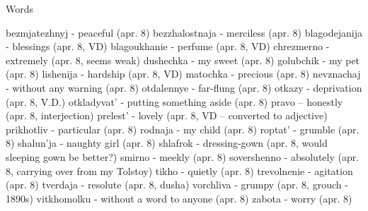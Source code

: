 Words

bezmjatezhnyj - peaceful (apr. 8)
bezzhalostnaja - merciless (apr. 8)
blagodejanija - blessings (apr. 8, VD)
blagoukhanie - perfume (apr. 8, VD)
chrezmerno - extremely (apr. 8, seems weak)
dushechka - my sweet (apr. 8)
golubchik - my pet (apr. 8)
lishenija - hardship (apr. 8, VD)
matochka - precious (apr. 8)
nevznachaj - without any warning (apr. 8)
otdalennye - far-flung (apr. 8)
otkazy - deprivation (apr. 8, V.D.)
otkladyvat' - putting something aside (apr. 8)
pravo -- honestly (apr. 8, interjection)
prelest' - lovely (apr. 8, VD -- converted to adjective)
prikhotliv - particular (apr. 8)
rodnaja - my child (apr. 8)
roptat' - grumble (apr. 8)
shalun'ja - naughty girl (apr. 8)
shlafrok - dressing-gown (apr. 8, would sleeping gown be better?)
smirno - meekly (apr. 8)
sovershenno - absolutely (apr. 8, carrying over from my Tolstoy)
tikho - quietly (apr. 8)
trevolnenie - agitation (apr. 8)
tverdaja - resolute (apr. 8, dusha)
vorchliva - grumpy (apr. 8, grouch - 1890s)
vitkhomolku - without a word to anyone (apr. 8)
zabota - worry (apr. 8)